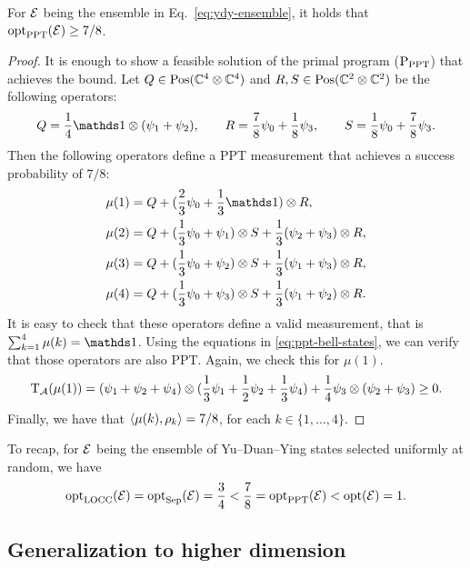 \begin{theorem}
\label{thm:primal-ppt-ydy}
For $\mathcal{E}$ being the ensemble in Eq.~\eqref{eq:ydy-ensemble}, it holds that $\operatorname{opt}_{\mathrm{PPT}}(\mathcal{E})\geq 7/8$.
\end{theorem}
\begin{proof}
It is enough to show a feasible solution of the primal program ($\textup{P}_{\mathrm{PPT}}$) 
that achieves the bound. 
Let $Q \in \mathrm{Pos}(\mathbb{C}^{4}\otimes\mathbb{C}^{4})$ and $R,S\in\mathrm{Pos}(\mathbb{C}^{2}\otimes\mathbb{C}^{2})$ 
be the following operators:
\[
  Q = \frac{1}{4}\I\otimes(\psi_{1}+\psi_{2}), \qquad
  R = \frac{7}{8}\psi_{0}+\frac{1}{8}\psi_{3}, \qquad 
  S = \frac{1}{8}\psi_{0}+\frac{7}{8}\psi_{3}.
\]
Then the following operators define a PPT measurement that achieves a success probability of $7/8$:
\begin{align*}
  \mu(1) &= Q + (\frac{2}{3}\psi_{0}+\frac{1}{3}\I)\otimes R ,\\
  \mu(2) &= Q + (\frac{1}{3}\psi_{0}+\psi_{1})\otimes S + \frac{1}{3}(\psi_{2}+\psi_{3})\otimes R ,\\
  \mu(3) &= Q + (\frac{1}{3}\psi_{0}+\psi_{2})\otimes S + \frac{1}{3}(\psi_{1}+\psi_{3})\otimes R ,\\
  \mu(4) &= Q + (\frac{1}{3}\psi_{0}+\psi_{3})\otimes S + \frac{1}{3}(\psi_{1}+\psi_{2})\otimes R .\\
\end{align*}
It is easy to check that these operators define a  valid measurement, that is $\sum_{k=1}^{4}\mu(k)=\I$.
Using the equations in \eqref{eq:ppt-bell-states}, we can verify that those operators are also PPT.
Again, we check this for $\mu(1)$.
\[
\operatorname{T}_{\mathcal{A}}(\mu(1)) = 
(\psi_{1} + \psi_{2} + \psi_{4})\otimes(\frac{1}{3}\psi_{1}+\frac{1}{2}\psi_{2}+\frac{1}{3}\psi_{4})
+ \frac{1}{4}\psi_{3}\otimes(\psi_{2}+\psi_{3}) \geq 0. 
\]
Finally, we have that $\langle \mu(k) , \rho_{k}\rangle = 7/8$, for each $k \in \{1,\ldots,4\}$.
\end{proof}

To recap, for $\mathcal{E}$ being the ensemble of Yu--Duan--Ying states selected uniformly at random, we have
\begin{equation}
  \operatorname{opt}_{\mathrm{LOCC}}(\mathcal{E}) = \operatorname{opt}_{\mathrm{Sep}}(\mathcal{E}) = \frac{3}{4} < \frac{7}{8} = \operatorname{opt}_{\mathrm{PPT}}(\mathcal{E}) < \operatorname{opt}(\mathcal{E}) = 1.  
\end{equation}

\subsection{Generalization to higher dimension}


